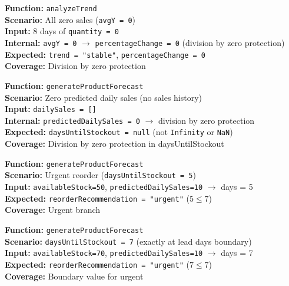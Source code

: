 \documentclass[12pt,a4paper]{report}
\newcommand{\pone}{\textbf{\color{p1red}P1}}
\begin{document}
\begin{tcolorbox}[criticalbox, title={FORE-012 \hfill \pone\ --- Division by Zero}]
\textbf{Function:} \texttt{analyzeTrend} \\
\textbf{Scenario:} All zero sales (\texttt{avgY = 0}) \\
\textbf{Input:} 8 days of \texttt{quantity = 0} \\
\textbf{Internal:} \texttt{avgY = 0} $\to$ \texttt{percentageChange = 0} (division by zero protection) \\
\textbf{Expected:} \texttt{trend = "stable"}, \texttt{percentageChange = 0} \\
\textbf{Coverage:} Division by zero protection
\end{tcolorbox}

\begin{tcolorbox}[criticalbox, title={FORE-018 \hfill \pone\ --- Zero Sales Stockout}]
\textbf{Function:} \texttt{generateProductForecast} \\
\textbf{Scenario:} Zero predicted daily sales (no sales history) \\
\textbf{Input:} \texttt{dailySales = []} \\
\textbf{Internal:} \texttt{predictedDailySales = 0} $\to$ division by zero protection \\
\textbf{Expected:} \texttt{daysUntilStockout = null} (not \texttt{Infinity} or \texttt{NaN}) \\
\textbf{Coverage:} Division by zero protection in daysUntilStockout
\end{tcolorbox}

\begin{tcolorbox}[testbox, title={FORE-019 \hfill \pone}]
\textbf{Function:} \texttt{generateProductForecast} \\
\textbf{Scenario:} Urgent reorder (\texttt{daysUntilStockout = 5}) \\
\textbf{Input:} \texttt{availableStock=50}, \texttt{predictedDailySales=10} $\to$ days = 5 \\
\textbf{Expected:} \texttt{reorderRecommendation = "urgent"} ($5 \leq 7$) \\
\textbf{Coverage:} Urgent branch
\end{tcolorbox}

\begin{tcolorbox}[testbox, title={FORE-020 \hfill \pone\ --- Boundary}]
\textbf{Function:} \texttt{generateProductForecast} \\
\textbf{Scenario:} \texttt{daysUntilStockout = 7} (exactly at lead days boundary) \\
\textbf{Input:} \texttt{availableStock=70}, \texttt{predictedDailySales=10} $\to$ days = 7 \\
\textbf{Expected:} \texttt{reorderRecommendation = "urgent"} ($7 \leq 7$) \\
\textbf{Coverage:} Boundary value for urgent
\end{tcolorbox}
\end{document}
